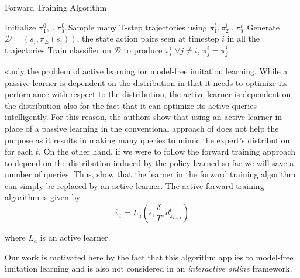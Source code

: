 \begin{algorithm}[H]
\caption{Forward Training Algorithm}
\label{alg:forwardtraining}
\begin{algorithmic}
\State Initialize $\pi_1^0, \hdots \pi_{T}^0$
	\State Sample many T-step trajectories using $\pi_1^t, \pi_2^t \hdots \pi_T^t$
	\State Generate $\mathcal{D} = {(s_i, \pi_E(s_i))}$, the state action pairs seen at timestep $i$ in all the trajectories
	\State Train classifier on $\mathcal{D}$ to produce $\pi_{i}^{i}$
	\State $\forall j \neq i$, $\pi_j^i = \pi_j^{i-1}$
\EndFor

\end{algorithmic}
\end{algorithm}


\citet{DBLP:journals/corr/abs-1210-4876} study the problem of active learning for model-free imitation learning. While a  passive learner is dependent on the distribution in that it needs to optimize its performance with respect to the distribution, the active learner is dependent on the distribution also for the fact that it can optimize its active queries intelligently. For this reason, the authors show that using an active learner in place of a passive learning in the conventional approach of \citet{DBLP:conf/nips/SyedS10} does not help the purpose as it results in making many queries to mimic the expert's distribution for each $t$. On the other hand, if we were to follow the forward training approach to depend on the distribution induced by the policy learned so far  we will save a number of queries. Thus, \citet{DBLP:journals/corr/abs-1210-4876} show that the learner in the forward training algorithm can simply be replaced by an active learner. The active forward training algorithm is given by 
\begin{equation}
\hat{\pi}_t = L_a(\epsilon,\frac{\delta}{T},d^t_{\hat{\pi}_{t-1}})
\end{equation}

where $L_a$ is an active learner. 


Our work is motivated here by the fact that this algorithm applies to model-free imitation learning and is also not considered in an \textit{interactive} \textit{online} framework. 



